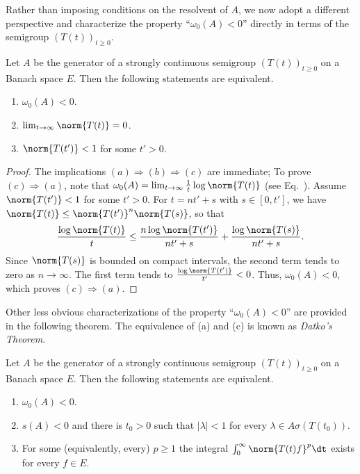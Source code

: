 Rather than imposing conditions on the resolvent of\/ $ A $, we now adopt a different perspective and characterize the property \enquote{$ \omega_{0}(A) < 0 $} directly in terms of the semigroup $ (T(t))_{t \geq 0} $.
\begin{proposition} \label{prop:a4-1.10} 
Let $ A $ be the generator of a strongly continuous semigroup $ (T(t))_{t \geq 0} $ on a Banach space $E$. 
Then the following statements are equivalent.
\begin{enumerate}[\upshape (a)]
\item  
$ \omega_{0}(A) < 0 $.
\item  
$ \lim_{t \to \infty} \norm{ T(t) } = 0 $.
\item  
$ \norm{ T(t') } < 1 $ for some $ t' > 0 $.
\end{enumerate}
\end{proposition}
\begin{proof}
The implications $(a)  \Rightarrow  (b)  \Rightarrow  (c) $ are immediate; To prove $(c)  \Rightarrow  (a) $, note that $\omega_{0}(A) = \lim_{t \to \infty} \frac{1}{t} \log \norm{ T(t) }$ (see Eq.~). Assume $\norm{T(t')} <1$ for some $t'>0$. For $t=nt'+s$ with $s\in [0,t']$, we have $\norm{T(t)}\le \norm{T(t')}^n\norm{T(s)}$, so that
\[
\displaystyle
\frac{\log \norm{T(t)}}{t} \leq \frac{n\log \norm{T(t')}}{nt'+s} + \frac{\log \norm{T(s)}}{nt' + s}.
\]
Since $\norm{T(s)}$ is bounded on compact intervals, the second term tends to zero as $n\to\infty$. The first term tends to $\frac{\log \norm{T(t')}}{t'} < 0$. Thus, $\omega_0(A) < 0$, which proves  $(c)  \Rightarrow  (a) $.
\end{proof}
Other less obvious characterizations of the property 
\enquote{$ \omega_{0}(A) < 0 $} are provided in the following theorem. 
The equivalence of (a) and (c) is known as \emph{Datko’s Theorem}.
\begin{theorem} \label{thm:a4-1.11} 
Let $ A $ be the generator of a strongly continuous semigroup $ (T(t))_{t \geq 0} $ on a Banach space $ E $. 
Then the following statements are equivalent.
\begin{enumerate}[\upshape (a)]
\item
$ \omega_{0}(A) < 0 $.
\item
$ s(A) < 0 $ and there is $ t_0 > 0 $ such that  
$ |\lambda| < 1$ for every $ \lambda \in A\sigma (T(t_0)).$
\item
For some (equivalently, every) $ p \geq 1 $ the integral $ \int_{0}^{\infty} \norm{ T(t) f }^p\dt $ exists for every $ f \in E $.
\end{enumerate}
\end{theorem}
